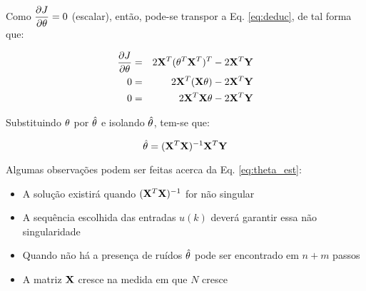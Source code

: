Como $\displaystyle\frac{\partial J}{\partial \mathbf{\theta}} = 0$ (escalar), então,
pode-se transpor a Eq. \ref{eq:deduc}, de tal forma que:

\begin{eqnarray}
\frac{\partial J}{\partial \mathbf{\theta}} & = & 
2\mathbf{X}^T(\mathbf{\theta}^T\mathbf{X}^T)^T - 2\mathbf{X}^T\mathbf{Y}\nonumber\\
0 & = & 2\mathbf{X}^T(\mathbf{X\theta}) - 2\mathbf{X}^T\mathbf{Y}\nonumber\\
0 & = & 2\mathbf{X}^T\mathbf{X\theta} - 2\mathbf{X}^T\mathbf{Y}
\end{eqnarray}

Substituindo $\mathbf{\theta}$ por $\hat{\mathbf{\theta}}$ e isolando
$\hat{\mathbf{\theta}}$, tem-se que:

\begin{equation}\label{eq:theta_est}
\hat{\mathbf{\theta}} = (\mathbf{X}^T\mathbf{X})^{-1} \mathbf{X}^T\mathbf{Y}
\end{equation}

Algumas observações podem ser feitas acerca da Eq. \ref{eq:theta_est}:

\begin{itemize}
    \item A solução existirá quando $(\mathbf{X}^T\mathbf{X})^{-1}$ for não singular
    \item A sequência escolhida das entradas $u(k)$ deverá garantir essa
          não singularidade
    \item Quando não há a presença de ruídos $\hat{\mathbf{\theta}}$ pode ser
          encontrado em $n+m$ passos
    \item A matriz $\mathbf{X}$ cresce na medida em que $N$ cresce
\end{itemize}
